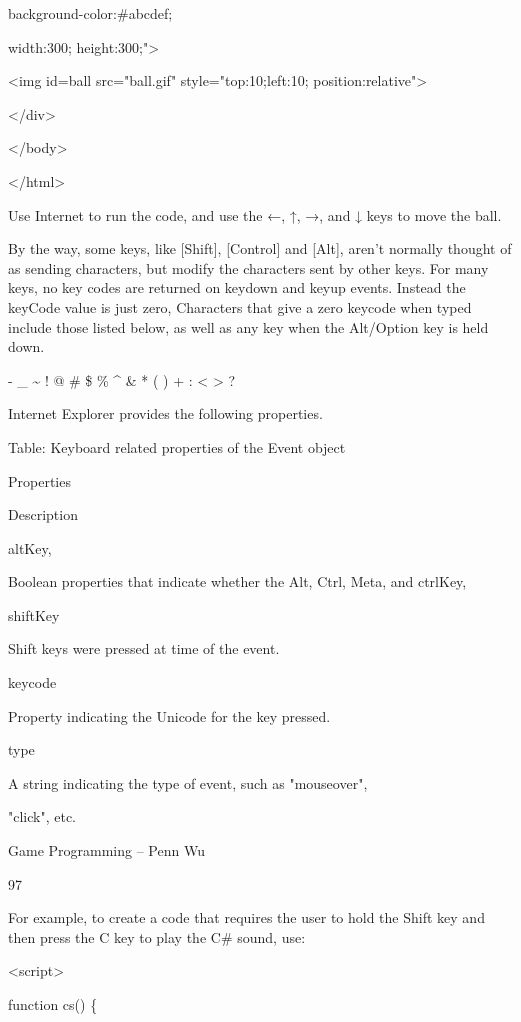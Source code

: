 \documentclass[
]{article}
\begin{document}
background-color:\#abcdef;

width:300; height:300;"\textgreater{}

\textless img id=ball src="ball.gif" style="top:10;left:10;
position:relative"\textgreater{}

\textless/div\textgreater{}

\textless/body\textgreater{}

\textless/html\textgreater{}

Use Internet to run the code, and use the ←, ↑, →, and ↓ keys to move
the ball.

By the way, some keys, like {[}Shift{]}, {[}Control{]} and {[}Alt{]},
aren't normally thought of as sending characters, but modify the
characters sent by other keys. For many keys, no key codes are returned
on keydown and keyup events. Instead the keyCode value is just zero,
Characters that give a zero keycode when typed include those listed
below, as well as any key when the Alt/Option key is held down.

- \_ \textasciitilde{} ! @ \# \$ \% \^{} \& * ( ) + \textbar{} :
\textless{} \textgreater{} ?

Internet Explorer provides the following properties.

Table: Keyboard related properties of the Event object

Properties

Description

altKey,

Boolean properties that indicate whether the Alt, Ctrl, Meta, and
ctrlKey,

shiftKey

Shift keys were pressed at time of the event.

keycode

Property indicating the Unicode for the key pressed.

type

A string indicating the type of event, such as "mouseover",

"click", etc.

Game Programming -- Penn Wu

97

\protect\hypertarget{index_split_007.htmlux5cux23p98}{}{}For example, to
create a code that requires the user to hold the Shift key and then
press the C key to play the C\# sound, use:

\textless script\textgreater{}

function cs() \{
\end{document}
